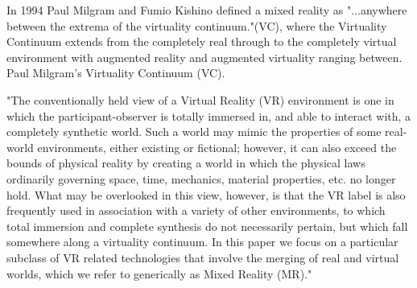 In 1994 Paul Milgram and Fumio Kishino defined a mixed reality as "...anywhere between the extrema of the virtuality continuum."(VC), where the Virtuality Continuum extends from the completely real through to the completely virtual environment with augmented reality and augmented virtuality ranging between.
Paul Milgram's Virtuality Continuum (VC).

"The conventionally held view of a Virtual Reality (VR) environment is one in which the participant-observer is totally immersed in, and able to interact with, a completely synthetic world. Such a world may mimic the properties of some real-world environments, either existing or fictional; however, it can also exceed the bounds of physical reality by creating a world in which the physical laws ordinarily governing space, time, mechanics, material properties, etc. no longer hold. What may be overlooked in this view, however, is that the VR label is also frequently used in association with a variety of other environments, to which total immersion and complete synthesis do not necessarily pertain, but which fall somewhere along a virtuality continuum. In this paper we focus on a particular subclass of VR related technologies that involve the merging of real and virtual worlds, which we refer to generically as Mixed Reality (MR)."